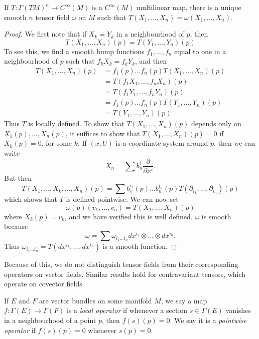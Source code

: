 \begin{theorem}
    If $T: \Gamma(TM)^n \to C^\infty(M)$ is a $C^\infty(M)$ multilinear map, there is a unique smooth $n$ tensor field $\omega$ on $M$ such that $T(X_1, \dots, X_n) = \omega(X_1, \dots, X_n)$.
\end{theorem}
\begin{proof}
    We first note that if $X_k = Y_k$ in a neighbourhood of $p$, then
    \[ T(X_1, \dots, X_n)(p) = T(Y_1, \dots, Y_n)(p) \]
    To see this, we find a smooth bump functions $f_1, \dots, f_n$ equal to one in a neighbourhood of $p$ such that $f_kX_k = f_kY_k$, and then
    \begin{align*}
        T(X_1, \dots, X_n)(p) &= f_1(p) \dots f_n(p) T(X_1, \dots, X_n)(p)\\
        &= T(f_1X_1, \dots, f_nX_n)(p)\\
        &= T(f_1Y_1, \dots, f_nY_n)(p)\\
        &= f_1(p) \dots f_n(p) T(Y_1, \dots, Y_n)(p)\\
        &= T(Y_1, \dots, Y_n)(p)
    \end{align*}
    Thus $T$ is locally defined. To show that $T(X_1, \dots, X_n)(p)$ depends only on $X_1(p), \dots, X_n(p)$, it suffices to show that $T(X_1, \dots, X_n)(p) = 0$ if $X_k(p) = 0$, for some $k$. If $(x,U)$ is a coordinate system around $p$, then we can write
    \[ X_n = \sum b_n^i \frac{\partial}{\partial x^i}. \]
    But then
    \[ T(X_1, \dots, X_k, \dots, X_n)(p) = \sum b_1^{i_1}(p) \dots b_n^{i_n}(p) T \left(\partial_{i_1}, \dots, \partial_{i_n} \right)(p) \]
    which shows that $T$ is defined pointwise. We can now set
    \[ \omega(p)(v_1, \dots, v_n) = T(X_1, \dots, X_n)(p) \]
    where $X_k(p) = v_k$, and we have verified this is well defined. $\omega$ is smooth because
    \[ \omega = \sum \omega_{i_1 \dots i_n} dx^{i_1} \otimes \dots \otimes dx^{i_n}. \]
    Thus $\omega_{i_1 \dots i_n} = T(dx^{i_1}, \dots, dx^{i_n})$ is a smooth function.
\end{proof}

Because of this, we do not distinguish tensor fields from their corresponding operators on vector fields. Similar results hold for contravariant tensors, which operate on covector fields.

If $E$ and $F$ are vector bundles on some manifold $M$, we say a map $f: \Gamma(E) \to \Gamma(F)$ is a \emph{local operator} if whenever a section $s \in \Gamma(E)$ vanishes in a neighbourhood of a point $p$, then $f(s)(p) = 0$. We say it is a \emph{pointwise operator} if $f(s)(p) = 0$ whenever $s(p) = 0$.

